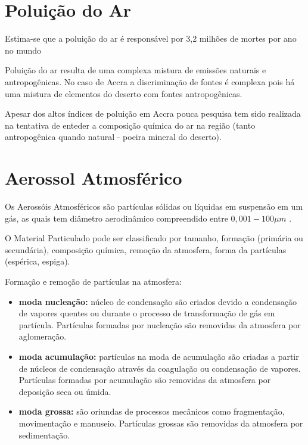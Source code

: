 
\section{Poluição do Ar}

Estima-se que a poluição do ar é responsável por 
3,2 milhões de mortes por ano no mundo \cite{lim2013}

Poluição do ar resulta de uma complexa mistura de emissões naturais e 
antropogênicas. No caso de Accra a discriminação de fontes é complexa pois
há uma mistura de elementos do deserto com fontes antropogênicas.

Apesar dos altos índices de poluição em Accra pouca pesquisa tem sido 
realizada na tentativa de enteder a composição química do ar na região
(tanto antropogênica quando natural - poeira mineral do deserto). 






\section{Aerossol Atmosférico}

Os Aerossóis Atmosféricos são partículas sólidas ou líquidas em 
suspensão em um gás, as quais tem diâmetro aerodinâmico compreendido 
entre $0,001-100\mu m$ \cite{seinfeld1998}.

 	


O Material Particulado pode ser classificado por tamanho, formação 
(primária ou secundária), composição química, remoção da atmosfera, 
forma da partículas (espérica, espiga).

Formação e remoção de partículas na atmosfera:
\begin{itemize}
  \item \textbf{moda nucleação:} núcleo de condensação são criados devido a 
        condensação de vapores quentes ou durante o processo de 
        transformação de gás em partícula. Partículas formadas por 
        nucleação são removidas da atmosfera por aglomeração. 
  \item \textbf{moda acumulação:} partículas na moda de acumulação são criadas 
         a partir de núcleos de condensação através da coagulação ou 
         condensação de vapores. Partículas formadas por acumulação
         são removidas da atmosfera por deposição seca ou úmida.
  \item \textbf{moda grossa:} são oriundas de processos mecânicos como fragmentação, 
        movimentação e manuseio. Partículas grossas são removidas da atmosfera 
        por sedimentação.
\end{itemize}

